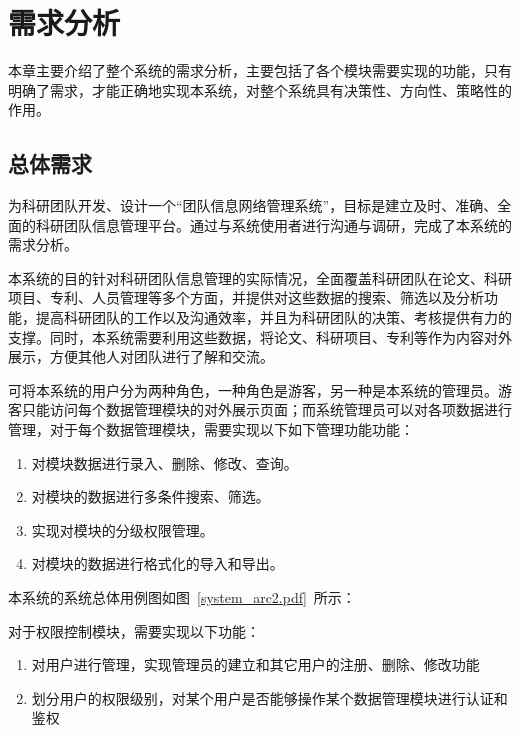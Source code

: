 \chapter{需求分析}

本章主要介绍了整个系统的需求分析，主要包括了各个模块需要实现的功能，只有明确了需求，才能正确地实现本系统，对整个系统具有决策性、方向性、策略性的作用。

\section{总体需求}
为科研团队开发、设计一个“团队信息网络管理系统”，目标是建立及时、准确、全面的科研团队信息管理平台。通过与系统使用者进行沟通与调研，完成了本系统的需求分析。

本系统的目的针对科研团队信息管理的实际情况，全面覆盖科研团队在论文、科研项目、专利、人员管理等多个方面，并提供对这些数据的搜索、筛选以及分析功能，提高科研团队的工作以及沟通效率，并且为科研团队的决策、考核提供有力的支撑。同时，本系统需要利用这些数据，将论文、科研项目、专利等作为内容对外展示，方便其他人对团队进行了解和交流。

可将本系统的用户分为两种角色，一种角色是游客，另一种是本系统的管理员。游客只能访问每个数据管理模块的对外展示页面；而系统管理员可以对各项数据进行管理，对于每个数据管理模块，需要实现以下如下管理功能功能：

\begin{enumerate}
\item 对模块数据进行录入、删除、修改、查询。
\item 对模块的数据进行多条件搜索、筛选。
\item 实现对模块的分级权限管理。
\item 对模块的数据进行格式化的导入和导出。
\end{enumerate}

本系统的系统总体用例图如图~\ref{system_arc2.pdf}~所示：


对于权限控制模块，需要实现以下功能：

\begin{enumerate}
\item 对用户进行管理，实现管理员的建立和其它用户的注册、删除、修改功能
\item 划分用户的权限级别，对某个用户是否能够操作某个数据管理模块进行认证和鉴权
\end{enumerate}



